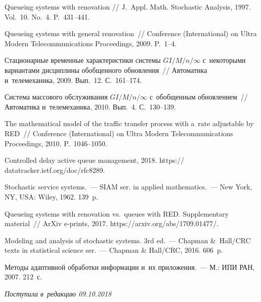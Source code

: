 \begin{multicols}{2}
{{\begin{thebibliography}{99}
Queueing systems with renovation //
{J.~Appl. Math. Stochastic Analysis}, 1997. Vol.~10. No.~4. P.~431--441.

 Queueing systems with general renovation~//
{Conference (International) on Ultra Modern Telecommunications Proceedings}, 2009.
P.~1--4.

Стационарные временные характеристики системы ${GI/M/n/\infty}$
с~некоторыми вариантами дисциплины обобщенного об\-нов\-ле\-ния~//
{Автоматика и~телемеханика}, 2009. Вып.~12. С.~161--174.

Система массового обслуживания $GI/M/n/\infty$ с~обобщенным об\-нов\-ле\-ни\-ем~//
{Автоматика и~телемеханика}, 2010. Вып.~4. С.~130--139.

The mathematical model of the traffic transfer process with a~rate adjustable by {RED}~//
{Conference (International) on Ultra Modern Telecommunications Proceedings}, 2010.
P.~1046--1050.

Controlled delay active queue management, 2018.
{\sf https:// datatracker.ietf.org/doc/rfc8289}.


 {Stochastic service systems}.~--- 
SIAM ser. in applied mathematics.~--- New York, NY, USA: Wiley, 1962. 139~p.

Queueing systems with renovation vs.\ queues with RED. Supplementary material~//
{ArXiv e-prints}, 2017. {\sf https://arxiv.\linebreak org/abs/1709.01477/}.

 Modeling and analysis of stochastic systems. 3rd ed.~--- 
Chapman \&~Hall/CRC texts in statistical science ser.~---
Chapman \& Hall/CRC, 2016. 606~p.

{Методы адаптивной обработки информации и~их приложения.}~--- 
М.: ИПИ РАН, 2007. 212~с.
\end{thebibliography}
} }

\end{multicols}

 \label{end\stat}

 \vspace*{-3pt}

\hfill{\small\textit{Поступила в~редакцию  09.10.2018}}


\renewcommand{\tablename}{\protect\bf Таблица}